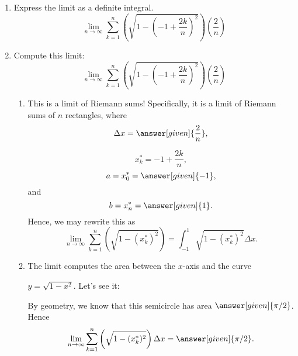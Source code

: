 \documentclass{ximera}
\begin{document}
\begin{example}
\begin{enumerate}


\item Express the limit as a definite integral.
 \[
  \lim_{n\to \infty} \sum_{k=1}^n \left(\sqrt{1-\left(-1+\frac{2k}{n}\right)^2}\right)
  \left(\frac{2}{n}\right)
  \]
  \item Compute this limit:
  \[
  \lim_{n\to \infty} \sum_{k=1}^n \left(\sqrt{1-\left(-1+\frac{2k}{n}\right)^2}\right)
  \left(\frac{2}{n}\right)
  \]

  \begin{explanation}
  \begin{enumerate}
  \item  This is a limit of Riemann sums!  Specifically, it is a limit of
    Riemann sums of $n$ rectangles, where
    \[
    \Delta x = \answer[given]{\frac{2}{n}},
    \]
 
    \[
    x_k^* = -1+\frac{2k}{n},
    \]
    \[
   a= x_0^* = \answer[given]{-1},
    \]
    and
     \[
    b=x_n^* = \answer[given]{1}.
    \]
    Hence, we may rewrite this as
    \[
    \lim_{n\to \infty} \sum_{k=1}^n \left(\sqrt{1-(x_k^*)^2}\right)=\int_{-1}^{1}\sqrt{1-(x_k^*)^2}
    \Delta x.
    \]
  \item The limit  computes the area between the $x$-axis and
    the curve
    
     $y = \sqrt{1-x^2}$. Let's see it:
    \begin{image}
    \end{image}
    By geometry, we know that this semicircle has area $\answer[given]{\pi/2}$. Hence
    \[
    \lim_{n\to \infty} \sum_{k=1}^n \left(\sqrt{1-(x_k^*)^2}\right)\Delta x =\answer[given]{\pi/2}.
    \]
     \end{enumerate}
  \end{explanation}
  \end{enumerate}
\end{example}
\end{document}
